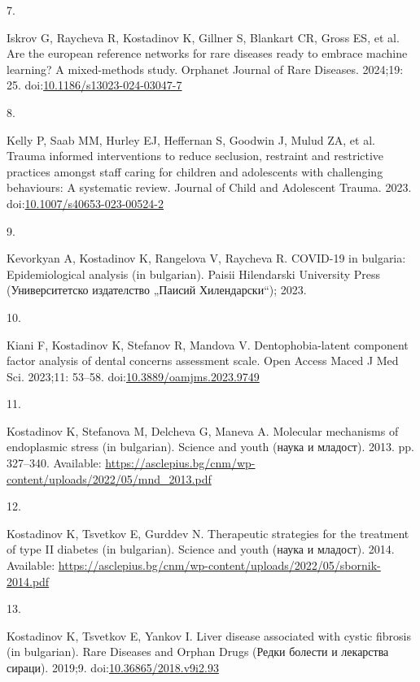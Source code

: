 \documentclass[
  12pt,
  letterpaper,
  DIV=11,
  numbers=noendperiod]{scrartcl}
\newlength{\cslhangindent}
\newlength{\csllabelwidth}
\newenvironment{CSLReferences}[2] %
 {\begin{list}{}{%
  \setlength{\itemindent}{0pt}
  \setlength{\leftmargin}{0pt}
  \setlength{\parsep}{0pt}
  \ifodd #1
   \setlength{\leftmargin}{\cslhangindent}
   \setlength{\itemindent}{-1\cslhangindent}
  \fi
  \setlength{\itemsep}{#2\baselineskip}}}
 {\end{list}}
\newcommand{\CSLLeftMargin}[1]{\parbox[t]{\csllabelwidth}{\strut#1\strut}}
\newcommand{\CSLRightInline}[1]{\parbox[t]{\linewidth - \csllabelwidth}{\strut#1\strut}}
\begin{document}
\begin{CSLReferences}{0}{1}
\CSLLeftMargin{7. }%
\CSLRightInline{Iskrov G, Raycheva R, Kostadinov K, Gillner S, Blankart
CR, Gross ES, et al. Are the european reference networks for rare
diseases ready to embrace machine learning? A mixed-methods study.
Orphanet Journal of Rare Diseases. 2024;19: 25.
doi:\href{https://doi.org/10.1186/s13023-024-03047-7}{10.1186/s13023-024-03047-7}}

\CSLLeftMargin{8. }%
\CSLRightInline{Kelly P, Saab MM, Hurley EJ, Heffernan S, Goodwin J,
Mulud ZA, et al. Trauma informed interventions to reduce seclusion,
restraint and restrictive practices amongst staff caring for children
and adolescents with challenging behaviours: A systematic review.
Journal of Child and Adolescent Trauma. 2023.
doi:\href{https://doi.org/10.1007/s40653-023-00524-2}{10.1007/s40653-023-00524-2}}

\CSLLeftMargin{9. }%
\CSLRightInline{Kevorkyan A, Kostadinov K, Rangelova V, Raycheva R.
COVID-19 in bulgaria: Epidemiological analysis (in bulgarian). Paisii
Hilendarski University Press (Университетско издателство „Паисий
Хилендарски``); 2023. }

\CSLLeftMargin{10. }%
\CSLRightInline{Kiani F, Kostadinov K, Stefanov R, Mandova V.
Dentophobia-latent component factor analysis of dental concerns
assessment scale. Open Access Maced J Med Sci. 2023;11: 53--58.
doi:\href{https://doi.org/10.3889/oamjms.2023.9749}{10.3889/oamjms.2023.9749}}

\CSLLeftMargin{11. }%
\CSLRightInline{Kostadinov K, Stefanova M, Delcheva G, Maneva A.
Molecular mechanisms of endoplasmic stress (in bulgarian). Science and
youth (наука и младост). 2013. pp. 327--340. Available:
\url{https://asclepius.bg/cnm/wp-content/uploads/2022/05/mnd_2013.pdf}}

\CSLLeftMargin{12. }%
\CSLRightInline{Kostadinov K, Tsvetkov E, Gurddev N. Therapeutic
strategies for the treatment of type II diabetes (in bulgarian). Science
and youth (наука и младост). 2014. Available:
\url{https://asclepius.bg/cnm/wp-content/uploads/2022/05/sbornik-2014.pdf}}

\CSLLeftMargin{13. }%
\CSLRightInline{Kostadinov K, Tsvetkov E, Yankov I. Liver disease
associated with cystic fibrosis (in bulgarian). Rare Diseases and Orphan
Drugs (Редки болести и лекарства сираци). 2019;9.
doi:\href{https://doi.org/10.36865/2018.v9i2.93}{10.36865/2018.v9i2.93}}


\end{CSLReferences}
\end{document}
